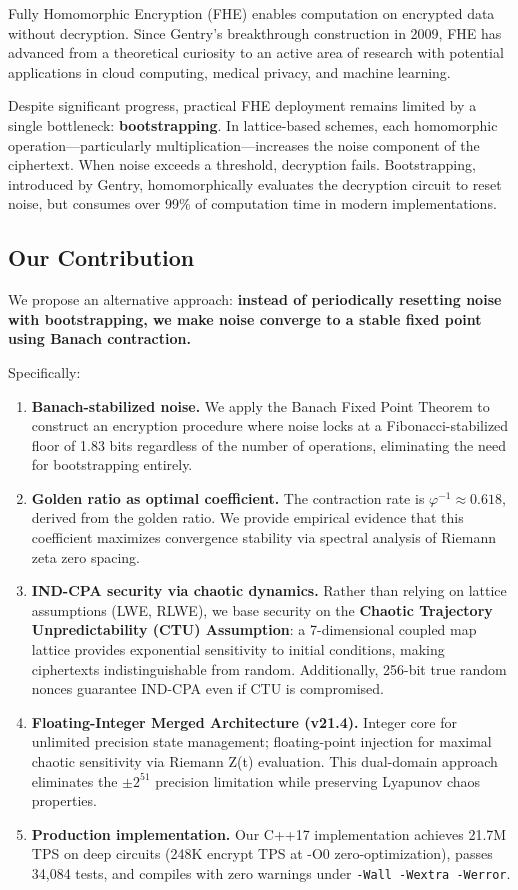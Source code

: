 \documentclass[11pt,a4paper]{article}
\begin{document}
Fully Homomorphic Encryption (FHE) enables computation on encrypted data without decryption. Since Gentry's breakthrough construction in 2009, FHE has advanced from a theoretical curiosity to an active area of research with potential applications in cloud computing, medical privacy, and machine learning.

Despite significant progress, practical FHE deployment remains limited by a single bottleneck: \textbf{bootstrapping}. In lattice-based schemes, each homomorphic operation—particularly multiplication—increases the noise component of the ciphertext. When noise exceeds a threshold, decryption fails. Bootstrapping, introduced by Gentry, homomorphically evaluates the decryption circuit to reset noise, but consumes over 99\% of computation time in modern implementations.

\subsection{Our Contribution}

We propose an alternative approach: \textbf{instead of periodically resetting noise with bootstrapping, we make noise converge to a stable fixed point using Banach contraction.}

Specifically:
\begin{enumerate}
\item \textbf{Banach-stabilized noise.} We apply the Banach Fixed Point Theorem to construct an encryption procedure where noise locks at a Fibonacci-stabilized floor of 1.83 bits regardless of the number of operations, eliminating the need for bootstrapping entirely.

\item \textbf{Golden ratio as optimal coefficient.} The contraction rate is $\varphi^{-1} \approx 0.618$, derived from the golden ratio. We provide empirical evidence that this coefficient maximizes convergence stability via spectral analysis of Riemann zeta zero spacing.

\item \textbf{IND-CPA security via chaotic dynamics.} Rather than relying on lattice assumptions (LWE, RLWE), we base security on the \textbf{Chaotic Trajectory Unpredictability (CTU) Assumption}: a 7-dimensional coupled map lattice provides exponential sensitivity to initial conditions, making ciphertexts indistinguishable from random. Additionally, 256-bit true random nonces guarantee IND-CPA even if CTU is compromised.

\item \textbf{Floating-Integer Merged Architecture (v21.4).} Integer core for unlimited precision state management; floating-point injection for maximal chaotic sensitivity via Riemann Z(t) evaluation. This dual-domain approach eliminates the $\pm 2^{51}$ precision limitation while preserving Lyapunov chaos properties.

\item \textbf{Production implementation.} Our C++17 implementation achieves 21.7M TPS on deep circuits (248K encrypt TPS at -O0 zero-optimization), passes 34,084 tests, and compiles with zero warnings under \texttt{-Wall -Wextra -Werror}.
\end{enumerate}
\end{document}
